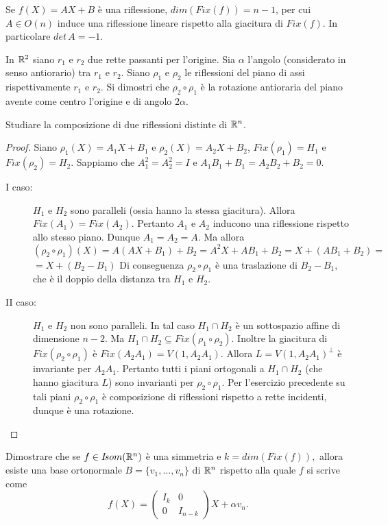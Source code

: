  
 \begin{remark}
 Se $f(X)=AX+B$ è una riflessione, $dim(Fix(f))=n-1$, per cui
 $A\in O(n)$ induce una riflessione lineare rispetto alla giacitura di $Fix(f)$. In particolare $det\,A=-1$.
 \end{remark}
 
 \begin{exercise}
In $\mathbb R^2$ siano $r_1$ e $r_2$ due rette passanti per l'origine. Sia $\alpha$
 l'angolo (considerato in senso antiorario) tra $r_1$ e $r_2$. Siano $\rho_1$ e $\rho_2$
 le riflessioni del piano di assi rispettivamente $r_1$ e $r_2$.
 Si dimostri che $\rho_2\circ\rho_1$ è la rotazione antioraria del piano avente come centro l'origine e di angolo 
 $2\alpha$.
 \end{exercise}
 
 \begin{exercise}
 Studiare la composizione di due riflessioni distinte di $\mathbb R^n$.
 \end{exercise}
 
 \begin{proof}
Siano $\rho_1(X)=A_1X+B_1$ e $\rho_2(X)=A_2X+B_2$, $Fix(\rho_1)=H_1$ e
 $Fix(\rho_2)=H_2$. 
 Sappiamo che $A_1^2=A_2^2=I$ e $A_1B_1+B_1=A_2B_2+B_2=0$.
 
 \begin{description}
  \item[I caso:] $H_1$ e $H_2$ sono paralleli (ossia hanno la stessa giacitura).
 Allora $Fix(A_1)=Fix(A_2)$. Pertanto $A_1$ e $A_2$ inducono una riflessione rispetto allo stesso piano.
 Dunque $A_1=A_2=A$.
 Ma allora $(\rho_2\circ\rho_1)(X)=A(AX+B_1)+B_2=A^2X+AB_1+B_2=X+(AB_1+B_2)=$
 $=X+(B_2-B_1)$
 Di conseguenza $\rho_2\circ\rho_1$ è una traslazione di $B_2-B_1$, che è il doppio della distanza tra
 $H_1$ e $H_2$.
 \item[II caso: ] $H_1$ e $H_2$ non sono paralleli.
 In tal caso $H_1\cap H_2$ è un sottospazio affine di dimensione $n-2$.
 Ma $H_1\cap H_2\subseteq Fix(\rho_1\circ\rho_2)$.
 Inoltre la giacitura di $Fix(\rho_2\circ\rho_1)$ è
 $Fix(A_2A_1)=V(1,A_2A_1)$. Allora $L=V(1,A_2A_1)^{\bot}$ è invariante per $A_2A_1$.
 Pertanto tutti i piani ortogonali a $H_1\cap H_2$ (che hanno giacitura $L$) sono invarianti per
 $\rho_2\circ\rho_1$.
 Per l'esercizio precedente su tali piani $\rho_2\circ\rho_1$ è composizione di riflessioni rispetto a rette incidenti,
 dunque è una rotazione.
 \end{description}
 \end{proof}
 
 \begin{exercise}
Dimostrare che se $f\in I\!som( \mathbb R^n)$ è una simmetria e
 $k=dim(Fix(f)),$ allora esiste una base ortonormale $B=\{v_1,\ldots,v_n\}$ di $\mathbb R^n$ rispetto alla quale
 $f$ si scrive come
 $$f(X)=\left(
 \begin{array}{cc}
  I_k & 0\\
  0 & I_{n-k}
 \end{array}
 \right)
 X+\alpha v_n.
 $$
 \end{exercise}
 

